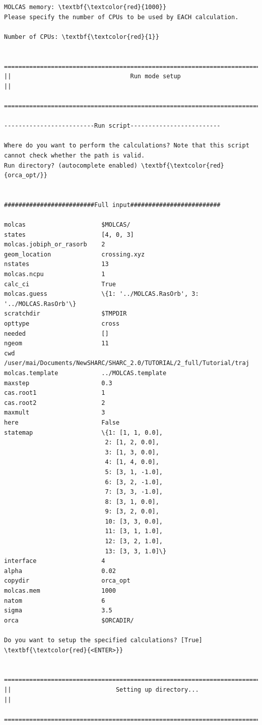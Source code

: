 \documentclass[a4paper,11pt,DIV=15,openany]{scrbook}
\begin{document}
\begin{oframed}
\begin{Verbatim}[commandchars=\\\{\}]
MOLCAS memory: \textbf{\textcolor{red}{1000}}
Please specify the number of CPUs to be used by EACH calculation.

Number of CPUs: \textbf{\textcolor{red}{1}}

  ================================================================================
||                                 Run mode setup                                 ||
  ================================================================================

-------------------------Run script-------------------------

Where do you want to perform the calculations? Note that this script cannot check whether the path is valid.
Run directory? (autocomplete enabled) \textbf{\textcolor{red}{orca_opt/}}


#########################Full input#########################

molcas                     $MOLCAS/
states                     [4, 0, 3]
molcas.jobiph_or_rasorb    2
geom_location              crossing.xyz
nstates                    13
molcas.ncpu                1
calc_ci                    True
molcas.guess               \{1: '../MOLCAS.RasOrb', 3: '../MOLCAS.RasOrb'\}
scratchdir                 $TMPDIR
opttype                    cross
needed                     []
ngeom                      11
cwd                        /user/mai/Documents/NewSHARC/SHARC_2.0/TUTORIAL/2_full/Tutorial/traj
molcas.template            ../MOLCAS.template
maxstep                    0.3
cas.root1                  1
cas.root2                  2
maxmult                    3
here                       False
statemap                   \{1: [1, 1, 0.0], 
                            2: [1, 2, 0.0], 
                            3: [1, 3, 0.0], 
                            4: [1, 4, 0.0], 
                            5: [3, 1, -1.0], 
                            6: [3, 2, -1.0], 
                            7: [3, 3, -1.0], 
                            8: [3, 1, 0.0], 
                            9: [3, 2, 0.0], 
                            10: [3, 3, 0.0], 
                            11: [3, 1, 1.0], 
                            12: [3, 2, 1.0], 
                            13: [3, 3, 1.0]\}
interface                  4
alpha                      0.02
copydir                    orca_opt
molcas.mem                 1000
natom                      6
sigma                      3.5
orca                       $ORCADIR/

Do you want to setup the specified calculations? [True] \textbf{\textcolor{red}{<ENTER>}}

  ================================================================================
||                             Setting up directory...                            ||
  ================================================================================
\end{Verbatim}
\end{oframed}
\end{document}
